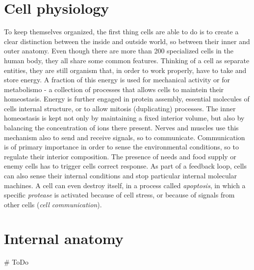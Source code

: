 \documentclass[../main/main.tex]{subfiles}
\begin{document}
\section{Cell physiology}



To keep themselves organized, the first thing cells are able to do is to create a clear distinction between the inside and outside world, so between their inner and outer anatomy. Even though there are more than 200 specialized cells in the human body, they all share some common features. Thinking of a cell as separate entities, they are still organism that, in order to work properly, have to take and store energy. A fraction of this energy is used for mechanical activity or for metabolismo - a collection of processes that allows cells to maintein their homeostasis. Energy is further engaged in protein assembly, essential molecules of cells internal structure, or to allow mitosis (duplicating) processes.
The inner homeostasis is kept not only by maintaining a fixed interior volume, but also by balancing the concentration of ions there present. Nerves and muscles use this mechanism also to send and receive signals, so to communicate. Communication is of primary importance in order to sense the environmental conditions, so to regulate their interior composition. The presence of needs and food supply or enemy cells has to trigger cells correct response. As part of a feedback loop, cells can also sense their internal conditions and stop particular internal molecular machines.
A cell can even destroy itself, in a process called \emph{apoptosis}, in which a specific \emph{protease} is activated because of cell stress, or because of signals from other cells (\emph{cell communication}). 

\section{Internal anatomy}
\# ToDo
\end{document}
